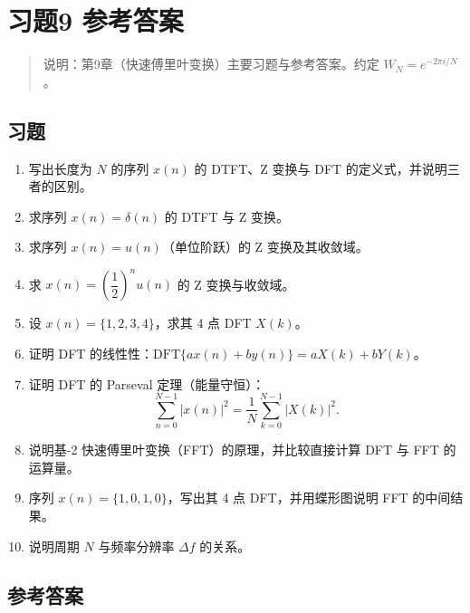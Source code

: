 \chapter{习题9 参考答案}\label{ux4e60ux98989-ux53c2ux8003ux7b54ux6848}

\begin{quote}
说明：第9章（快速傅里叶变换）主要习题与参考答案。约定
\(W_N=e^{-2\pi i/N}\)。
\end{quote}

\section{习题}\label{ux4e60ux9898-8}

\begin{enumerate}
\def\labelenumi{\arabic{enumi}.}
\item
  写出长度为 \(N\) 的序列 \(x(n)\) 的 DTFT、Z 变换与 DFT
  的定义式，并说明三者的区别。
\item
  求序列 \(x(n)=\delta(n)\) 的 DTFT 与 Z 变换。
\item
  求序列 \(x(n)=u(n)\)（单位阶跃）的 Z 变换及其收敛域。
\item
  求 \(x(n)=\left(\dfrac12\right)^n u(n)\) 的 Z 变换与收敛域。
\item
  设 \(x(n)=\{1,2,3,4\}\)，求其 4 点 DFT \(X(k)\)。
\item
  证明 DFT 的线性性：\(\mathrm{DFT}\{a x(n)+b y(n)\}=aX(k)+bY(k)\)。
\item
  证明 DFT 的 Parseval 定理（能量守恒）： \[
  \sum_{n=0}^{N-1}|x(n)|^2=\dfrac1N\sum_{k=0}^{N-1}|X(k)|^2 .
  \]
\item
  说明基-2 快速傅里叶变换（FFT）的原理，并比较直接计算 DFT 与 FFT
  的运算量。
\item
  序列 \(x(n)=\{1,0,1,0\}\)，写出其 4 点 DFT，并用蝶形图说明 FFT
  的中间结果。
\item
  说明周期 \(N\) 与频率分辨率 \(\Delta f\) 的关系。
\end{enumerate}

\section{参考答案}\label{ux53c2ux8003ux7b54ux6848-8}


